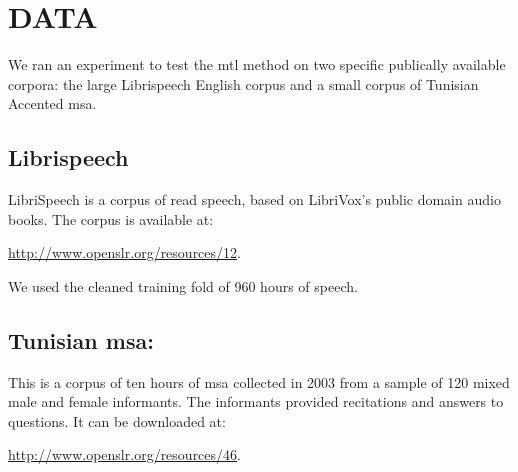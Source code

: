 \section{DATA}
\label{sec-3}

We ran an experiment to test the \gls{mtl} method on two specific publically available corpora: the large Librispeech English corpus and a small corpus of Tunisian Accented \gls{msa}. 


\subsection{Librispeech}
\label{sec-3-1}

LibriSpeech is a corpus of read speech, based on LibriVox's public domain audio books.
The corpus is available at:

\url{http://www.openslr.org/resources/12}.

We used the cleaned training fold of 960 hours of speech. 

\subsection{Tunisian \gls{msa}:}
\label{sec-3-2}

This is a corpus of ten hours of \gls{msa}
collected
in 2003
from a sample of 120 mixed male and female informants. 
The informants provided recitations and answers to questions. 
It can be downloaded at:

\url{http://www.openslr.org/resources/46}.
